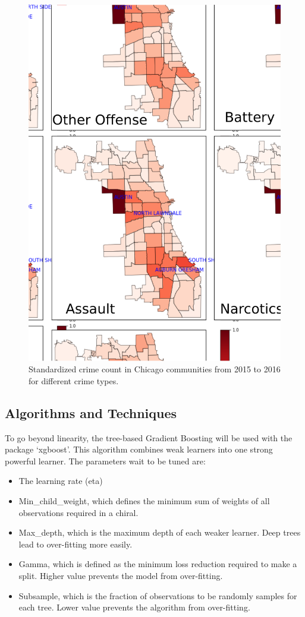 \documentclass[12pt]{article}
\begin{document}
\begin{figure}[ht]
\includegraphics[scale=0.35]{figure/community.eps}
\centering
\caption{Standardized crime count in Chicago communities from 2015 to 2016 for different crime types.}
\end{figure}

\subsection{Algorithms and Techniques}
To go beyond linearity, the tree-based Gradient Boosting will be used with the package ‘xgboost’. This algorithm combines weak learners into one strong powerful learner. The parameters wait to be tuned are:
\begin{itemize}
\item The learning rate (eta)
\item Min\_child\_weight, which defines the minimum sum of weights of all observations required in a chiral.
\item Max\_depth, which is the maximum depth of each weaker learner. Deep trees lead to over-fitting more easily.
\item Gamma, which is defined as the minimum loss reduction required to make a split. Higher value prevents the model from over-fitting.
\item Subsample, which is the fraction of observations to be randomly samples for each tree. Lower value prevents the algorithm from over-fitting.
\end{itemize}
\end{document}
